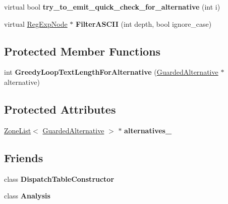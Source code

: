 \begin{DoxyCompactItemize}
\item 
\hypertarget{classv8_1_1internal_1_1_choice_node_aeffa466aec1c019bebfeb833e05c4ae6}{}virtual bool {\bfseries try\+\_\+to\+\_\+emit\+\_\+quick\+\_\+check\+\_\+for\+\_\+alternative} (int i)\label{classv8_1_1internal_1_1_choice_node_aeffa466aec1c019bebfeb833e05c4ae6}

\item 
\hypertarget{classv8_1_1internal_1_1_choice_node_a9ef837737cc368710655184a4b91b762}{}virtual \hyperlink{classv8_1_1internal_1_1_reg_exp_node}{Reg\+Exp\+Node} $\ast$ {\bfseries Filter\+A\+S\+C\+I\+I} (int depth, bool ignore\+\_\+case)\label{classv8_1_1internal_1_1_choice_node_a9ef837737cc368710655184a4b91b762}

\end{DoxyCompactItemize}
\subsection*{Protected Member Functions}
\begin{DoxyCompactItemize}
\item 
\hypertarget{classv8_1_1internal_1_1_choice_node_a4c728774f51d6874a8894a444486f10e}{}int {\bfseries Greedy\+Loop\+Text\+Length\+For\+Alternative} (\hyperlink{classv8_1_1internal_1_1_guarded_alternative}{Guarded\+Alternative} $\ast$alternative)\label{classv8_1_1internal_1_1_choice_node_a4c728774f51d6874a8894a444486f10e}

\end{DoxyCompactItemize}
\subsection*{Protected Attributes}
\begin{DoxyCompactItemize}
\item 
\hypertarget{classv8_1_1internal_1_1_choice_node_a3820e11ba725590ffc4e1d5d3a2b19ad}{}\hyperlink{classv8_1_1internal_1_1_zone_list}{Zone\+List}$<$ \hyperlink{classv8_1_1internal_1_1_guarded_alternative}{Guarded\+Alternative} $>$ $\ast$ {\bfseries alternatives\+\_\+}\label{classv8_1_1internal_1_1_choice_node_a3820e11ba725590ffc4e1d5d3a2b19ad}

\end{DoxyCompactItemize}
\subsection*{Friends}
\begin{DoxyCompactItemize}
\item 
\hypertarget{classv8_1_1internal_1_1_choice_node_ab1c57f90b7cb7e0e0c0a088d6a0f8f6c}{}class {\bfseries Dispatch\+Table\+Constructor}\label{classv8_1_1internal_1_1_choice_node_ab1c57f90b7cb7e0e0c0a088d6a0f8f6c}

\item 
\hypertarget{classv8_1_1internal_1_1_choice_node_a1e23f70a55de946d03c863586003862d}{}class {\bfseries Analysis}\label{classv8_1_1internal_1_1_choice_node_a1e23f70a55de946d03c863586003862d}

\end{DoxyCompactItemize}
